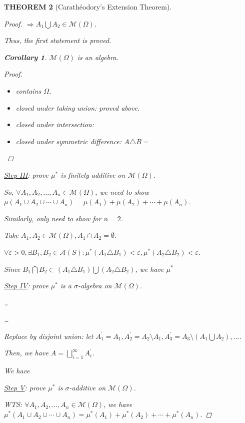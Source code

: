 \documentclass[12pt]{article}
\theoremstyle{blueplain}
\newtheorem{theorem}{THEOREM}[section]
\newtheorem{corollary}[theorem]{Corollary}
\theoremstyle{bluedef}
\theoremstyle{blueremark}
\newcommand{\eps}{\varepsilon}
\numberwithin{equation}{section}
\begin{document}
\begin{theorem}[Carathéodory's Extension Theorem]
\begin{proof}
    $\Rightarrow A_1 \bigcup A_2 \in \mathcal{M}(\Omega)$.

    Thus, the first statement is proved.

    \begin{corollary}
      $\mathcal{M}(\Omega)$ is an algebra.

      \begin{proof}
        \begin{itemize}
          \item contains $\Omega$.
          \item closed under taking union: proved above.
          \item closed under intersection:
          \item closed under symmetric difference: $A \triangle B = $
        \end{itemize}
      \end{proof}
    \end{corollary}

    \underline{Step III}: prove $\mu^*$ is finitely additive on $\mathcal{M}(\Omega)$.

    So, $\forall A_1, A_2, \ldots, A_n \in \mathcal{M}(\Omega)$, we need to show $\mu(A_1 \cup A_2 \cup \cdots \cup A_n) = \mu(A_1) + \mu(A_2) + \cdots + \mu(A_n)$.

    Similarly, only need to show for $n=2$.

    Take $A_1, A_2 \in \mathcal{M}(\Omega), A_1 \cap A_2 = \emptyset$.

    $\forall \eps > 0, \exists B_1, B_2 \in \mathcal{A}(S): \mu^*(A_1 \triangle B_1) < \eps, \mu^*(A_2 \triangle B_2) < \eps$.

    Since $B_1 \bigcap B_2 \subset (A_1 \triangle B_1) \bigcup (A_2 \triangle B_2)$, we have $\mu^*$




    \underline{Step IV}: prove $\mu^*$ is a $\sigma$-algebra on $\mathcal{M}(\Omega)$.



    \dots

    \dots




    Replace by disjoint union: let $A_1^{\prime} = A_1, A_2^{\prime} = A_2 \setminus A_1, A_3^{\prime} = A_3 \setminus (A_1 \bigcup A_2), \ldots$.

    Then, we have $A = \bigsqcup_{i=1}^{\infty}A_i^{\prime}$.

    We have







    \underline{Step V}: prove $\mu^*$ is $\sigma$-additive on $\mathcal{M}(\Omega)$.

    WTS: $\forall A_1, A_2, \ldots, A_n \in \mathcal{M}(\Omega)$, we have $\mu^*(A_1 \cup A_2 \cup \cdots \cup A_n) = \mu^*(A_1) + \mu^*(A_2) + \cdots + \mu^*(A_n)$.




  \end{proof}
\end{theorem}
\end{document}
